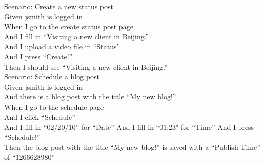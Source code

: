 \documentclass[12pt]{article}
\begin{document}
  Scenario: Create a new status post \\
    Given jsmith is logged in \\
    When I go to the create status post page \\
    And I fill in ``Visiting a new client in Beijing.'' \\
    And I upload a video file in ``Status' \\
    And I press ``Create!'' \\
    Then I should see ``Visiting a new client in Beijing.'' \\

  Scenario: Schedule a blog post \\
    Given jsmith is logged in \\
    And there is a blog post with the title ``My new blog!'' \\
    When I go to the schedule page \\
    And I click ``Schedule'' \\
    And I fill in ``02/20/10'' for ``Date''
    And I fill in ``01:23" for ``Time''
    And I press ``Schedule!'' \\
    Then the blog post with the title ``My new blog!'' is saved with a ``Publish Time'' of ``1266628980'' \\
\end{document}
